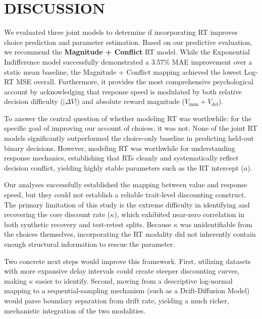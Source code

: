 \documentclass[11pt,a4paper]{article}
\theoremstyle{definition}
\begin{document}
\section{DISCUSSION}

We evaluated three joint models to determine if incorporating RT improves choice prediction and parameter estimation. Based on our predictive evaluation, we recommend the \textbf{Magnitude + Conflict} RT model. While the Exponential Indifference model successfully demonstrated a 3.57\% MAE improvement over a static mean baseline, the Magnitude + Conflict mapping achieved the lowest Log-RT MSE overall. Furthermore, it provides the most comprehensive psychological account by acknowledging that response speed is modulated by both relative decision difficulty ($|\Delta V|$) and absolute reward magnitude ($V_{\text{imm}} + V_{\text{del}}$).

To answer the central question of whether modeling RT was worthwhile: for the specific goal of improving our account of choices, it was not. None of the joint RT models significantly outperformed the choice-only baseline in predicting held-out binary decisions. However, modeling RT was worthwhile for understanding response mechanics, establishing that RTs cleanly and systematically reflect decision conflict, yielding highly stable parameters such as the RT intercept ($a$).

Our analyses successfully established the mapping between value and response speed, but they could not establish a reliable trait-level discounting construct. The primary limitation of this study is the extreme difficulty in identifying and recovering the core discount rate ($\kappa$), which exhibited near-zero correlation in both synthetic recovery and test-retest splits. Because $\kappa$ was unidentifiable from the choices themselves, incorporating the RT modality did not inherently contain enough structural information to rescue the parameter.

Two concrete next steps would improve this framework. First, utilizing datasets with more expansive delay intervals could create steeper discounting curves, making $\kappa$ easier to identify. Second, moving from a descriptive log-normal mapping to a sequential-sampling mechanism (such as a Drift-Diffusion Model) would parse boundary separation from drift rate, yielding a much richer, mechanistic integration of the two modalities.
\end{document}

